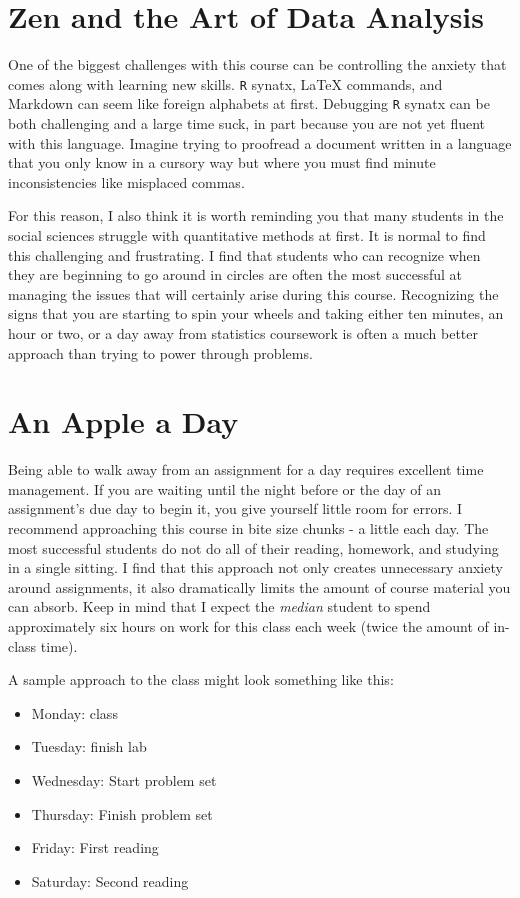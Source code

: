 \documentclass[]{book}
\providecommand{\tightlist}{%
  \setlength{\itemsep}{0pt}\setlength{\parskip}{0pt}}
\theoremstyle{definition}
\theoremstyle{definition}
\theoremstyle{definition}
\theoremstyle{remark}
\begin{document}
\section{Zen and the Art of Data
Analysis}\label{zen-and-the-art-of-data-analysis}

One of the biggest challenges with this course can be controlling the
anxiety that comes along with learning new skills. \texttt{R} synatx,
LaTeX commands, and Markdown can seem like foreign alphabets at first.
Debugging \texttt{R} synatx can be both challenging and a large time
suck, in part because you are not yet fluent with this language. Imagine
trying to proofread a document written in a language that you only know
in a cursory way but where you must find minute inconsistencies like
misplaced commas.

For this reason, I also think it is worth reminding you that many
students in the social sciences struggle with quantitative methods at
first. It is normal to find this challenging and frustrating. I find
that students who can recognize when they are beginning to go around in
circles are often the most successful at managing the issues that will
certainly arise during this course. Recognizing the signs that you are
starting to spin your wheels and taking either ten minutes, an hour or
two, or a day away from statistics coursework is often a much better
approach than trying to power through problems.

\section{An Apple a Day}\label{an-apple-a-day}

Being able to walk away from an assignment for a day requires excellent
time management. If you are waiting until the night before or the day of
an assignment's due day to begin it, you give yourself little room for
errors. I recommend approaching this course in bite size chunks - a
little each day. The most successful students do not do all of their
reading, homework, and studying in a single sitting. I find that this
approach not only creates unnecessary anxiety around assignments, it
also dramatically limits the amount of course material you can absorb.
Keep in mind that I expect the \emph{median} student to spend
approximately six hours on work for this class each week (twice the
amount of in-class time).

A sample approach to the class might look something like this:

\begin{itemize}
\tightlist
\item
  Monday: class
\item
  Tuesday: finish lab
\item
  Wednesday: Start problem set
\item
  Thursday: Finish problem set
\item
  Friday: First reading
\item
  Saturday: Second reading
\end{itemize}
\end{document}
